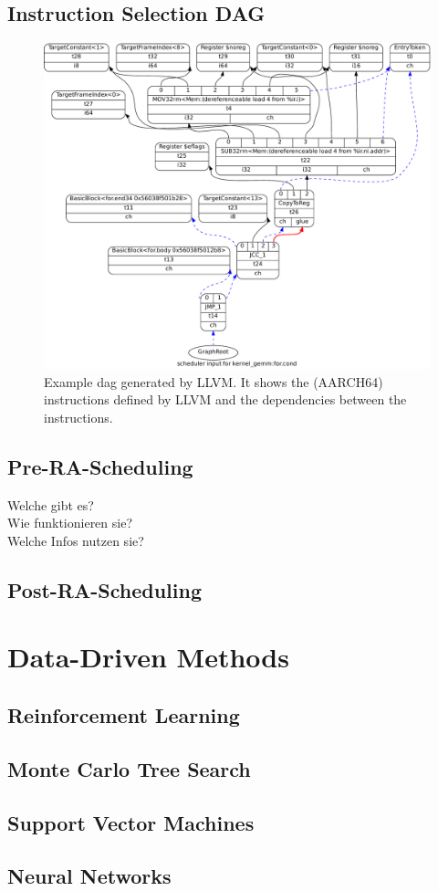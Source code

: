 \subsection{Instruction Selection DAG}
\begin{figure}
    \centering
    \includegraphics[width=\textwidth]{img/example-dag-crop.pdf}
    \caption[Example  generated by LLVM]{Example \ac{dag} generated by LLVM. It shows the (AARCH64) instructions defined by LLVM and the dependencies between the instructions.}
    \label{fig:bg:dag}
\end{figure}
\subsection{Pre-RA-Scheduling}
Welche gibt es?\\
Wie funktionieren sie?\\
Welche Infos nutzen sie?\\
\subsection{Post-RA-Scheduling}

\section{Data-Driven Methods}
\subsection{Reinforcement Learning}
\subsection{Monte Carlo Tree Search}
\label{sec:bg:mcts}
\subsection{Support Vector Machines}
\subsection{Neural Networks}
